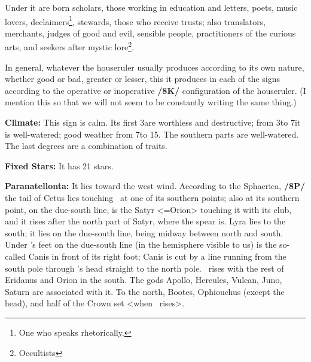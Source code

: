 Under it are born scholars, those working in education and letters, poets, music lovers, declaimers\footnote{One who speaks rhetorically.}, stewards, those who receive trusts; also translators, merchants, judges of good and evil, sensible people, practitioners of the curious arts, and seekers after mystic lore\footnote{Occultists}. 

\mndl[0.2cm]
In general, whatever the houseruler usually produces according to its own nature, whether good or bad, greater or lesser, this it produces in each of the signs according to the operative or inoperative \textbf{/8K/} configuration of the houseruler. (I mention this so that we will not seem to be constantly writing the same thing.)

\textbf{Climate:} This sign is calm. Its first 3\deg are worthless and destructive; from 3\deg to 7\deg it is well-watered; good weather from 7\deg to 15\deg. The southern parts are well-watered. The last degrees are a combination of traits.

\textbf{Fixed Stars:} It has 21 stars. 

\textbf{Paranatellonta:} It lies toward the west wind. According to the Sphaerica, \textbf{/8P/} the tail of Cetus lies touching \Gemini\, at one of its southern points; also at its southern point, on the due-south line, is the Satyr <=Orion> touching it with its club, and it rises after the north part of Satyr, where the spear is. Lyra lies to the south; it lies on the due-south line, being midway between north and south. Under \Gemini’s feet on the due-south line (in the hemisphere visible to us) is the so-called Canis in front of its right foot; Canis is cut by a line running from the south pole through \Gemini's head straight to the north pole. 
\Gemini\, rises with the rest of Eridanus and Orion in the south. The gods Apollo, Hercules, Vulcan, Juno, Saturn are associated with it. To the north, Bootes, Ophiouchus (except the head), and half of the Crown set <when \Gemini\, rises>. 

